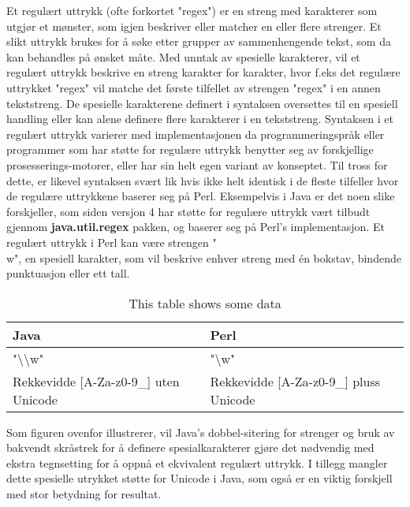 \documentclass[../main.tex]{subfiles}
\begin{document}
Et regulært uttrykk (ofte forkortet "regex") er en streng med karakterer som utgjør et mønster, som igjen beskriver eller matcher en eller flere strenger.  Et slikt uttrykk brukes for å søke etter grupper av sammenhengende tekst, som da kan behandles på ønsket måte. Med unntak av spesielle karakterer, vil et regulært uttrykk beskrive en streng karakter for karakter, hvor f.eks det regulære uttrykket "regex" vil matche det første tilfellet av strengen "regex" i en annen tekststreng. De spesielle karakterene definert i syntaksen oversettes til en spesiell handling eller kan alene definere flere karakterer i en tekststreng. \newline
Syntaksen i et regulært uttrykk varierer med implementasjonen da programmeringspråk eller programmer som har støtte for regulære uttrykk benytter seg av forskjellige prosesserings-motorer, eller har sin helt egen variant av konseptet. Til tross for dette, er likevel syntaksen svært lik hvis ikke helt identisk i de fleste tilfeller hvor de regulære uttrykkene baserer seg på Perl. Eksempelvis i Java er det noen slike forskjeller, som siden versjon 4 har støtte for regulære uttrykk vært tilbudt gjennom \textbf{java.util.regex} pakken, og baserer seg på Perl’s implementasjon. Et regulært uttrykk i Perl kan være strengen "\\w", en spesiell karakter, som vil beskrive enhver streng med én bokstav, bindende punktuasjon eller ett tall.

\begin{table}[H]
\begin{center}
\caption{This table shows some data}
  \begin{tabular}{ | p{6cm} | p{6cm} |}
    \hline
    Java & Perl \\ \hline
    "\textbackslash \textbackslash w" & "\textbackslash w" \\ \hline
    Rekkevidde [A-Za-z0-9\_] uten Unicode & Rekkevidde [A-Za-z0-9\_] pluss Unicode \\
    \hline
  \end{tabular}
\end{center}
\end{table}
Som figuren ovenfor illustrerer, vil Java’s dobbel-sitering for strenger og bruk av bakvendt skråstrek for å definere spesialkarakterer gjøre det nødvendig med ekstra tegnsetting for å oppnå et ekvivalent regulært uttrykk. I tillegg mangler dette spesielle utrykket støtte for Unicode i Java, som også er en viktig forskjell med stor betydning for resultat.
\end{document}
